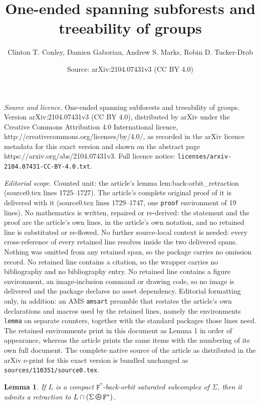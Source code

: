 \documentclass[10pt,a4paper]{amsart}
\title{One-ended spanning subforests and treeability of groups}
\author{Clinton T. Conley, Damien Gaboriau, Andrew S. Marks, Robin D. Tucker-Drob}
\date{Source: arXiv:2104.07431v3 (CC BY 4.0)}
\newtheorem{lemma}{Lemma}
\newcommand{\oPerpStar}{\begin{tikzpicture}[scale=0.134]
\draw[thick,line width=0.7pt](-0.6,-0.2)--(0.6,-0.2) ;
    \draw (0,0.1) node[scale=0.6] {\rm{*}};
  \draw[line width=0.7pt] (0,0) circle [radius=1];
\end{tikzpicture}}
\newcommand{\oPerpstar}{\mathbin{\raisebox{-1pt}{\oPerpStar}}}
\begin{document}
\maketitle

\noindent\emph{Source and licence.} One-ended spanning subforests and treeability of groups. Version arXiv:2104.07431v3 (CC BY 4.0), distributed by arXiv under the Creative Commons Attribution 4.0 International licence, http://creativecommons.org/licenses/by/4.0/, as recorded in the arXiv licence metadata for this exact version and shown on the abstract page https://arxiv.org/abs/2104.07431v3. Full licence notice: \texttt{licenses/arxiv-2104.07431-CC-BY-4.0.txt}.\par\smallskip

\noindent\textit{Editorial scope.} Counted unit: the article's lemma lem:back-orbit\_retraction (source0.tex lines 1725--1727). The article's complete original proof of it is delivered with it (source0.tex lines 1729--1747, one \texttt{proof} environment of 19 lines). No mathematics is written, repaired or re-derived: the statement and the proof are the article's own lines, in the article's own notation, and no retained line is substituted or re-flowed.  No further source-local context is needed: every cross-reference of every retained line resolves inside the two delivered spans.  Nothing was omitted from any retained span, so the package carries no omission record.  No retained line contains a citation, so the wrapper carries no bibliography and no bibliography entry.  No retained line contains a figure environment, an image-inclusion command or drawing code, so no image is delivered and the package declares no asset dependency.  Editorial formatting only, in addition: an AMS \texttt{amsart} preamble that restates the article's own declarations and macros used by the retained lines, namely the environments \texttt{lemma} on separate counters, together with the standard packages those lines need.  The retained environments print in this document as Lemma 1 in order of appearance, whereas the article prints the same items with the numbering of its own full document.  The complete native source of the article as distributed in the arXiv e-print for this exact version is bundled unchanged as \texttt{sources/110351/source0.tex}.
\begin{lemma}\label{lem:back-orbit_retraction}
If $L$ is a compact ${\mathtt{F}^{*}}$-back-orbit saturated subcomplex of ${\Sigma} $, then it admits a retraction to $L\cap ({\Sigma}\oPerpstar {{\mathtt{F}^{*}}})$.
\end{lemma}
\end{document}
